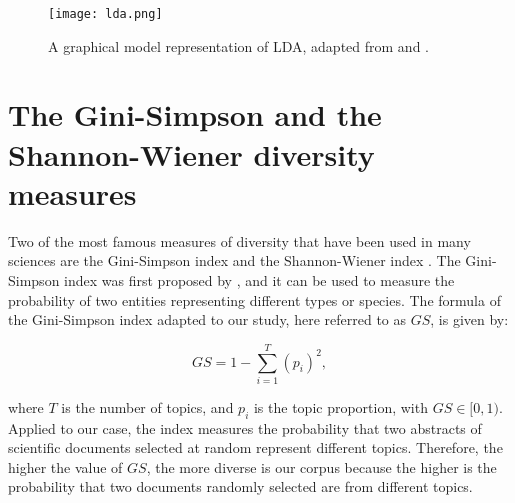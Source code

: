 \begin{figure}[!ht]
	\centering
	\texttt{[image: lda.png]}
	\caption{A graphical model representation of LDA, adapted from \cite{blei_latent_2003} and \cite{blei_topic_2009}.}
	\label{fig:lda}
\end{figure}

%
%

\section{The Gini-Simpson and the Shannon-Wiener diversity measures} \label{diversity_indices}

Two of the most famous measures of diversity that have been used in many sciences are the Gini-Simpson index and the Shannon-Wiener index \citep{jost_entropy_2006}. The Gini-Simpson index was first proposed by \cite{simpson_measurement_1949}, and it can be used to measure the probability of two entities representing different types or species. The formula of the Gini-Simpson index adapted to our study, here referred to as $GS$, is given by:

\begin{equation}
GS = 1 - \sum^{T}_{i = 1} (p_{i})^{2},
\label{gs_entropy}
\end{equation}

\noindent where $T$ is the number of topics, and $p_{i}$ is the topic proportion, with $GS \in [0,1)$. Applied to our case, the index measures the probability that two abstracts of scientific documents selected at random represent different topics. Therefore, the higher the value of $GS$, the more diverse is our corpus because the higher is the probability that two documents randomly selected are from different topics.

